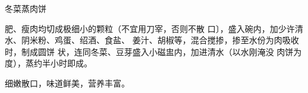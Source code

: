 \begin{recipe}{冬菜蒸肉饼}

\ingredients


\cooking

肥、瘦肉均切成极细小的颗粒（不宜用刀宰，否则不散 口〕，盛入碗内，加少许清水、阴米粉、鸡蛋、绍酒、食盐、 姜汁、胡椒等，混合搅掺，掺至水份为肉吸收时，制成圆饼 状，连同冬菜、豆芽盛入小磁盅内，加进清水（以水刚淹没 肉饼为度），蒸约半小时即成。

\notes

细嫩散口，味道鲜美，营养丰富。

\end{recipe}

